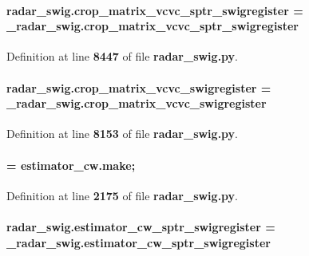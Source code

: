 \paragraph[{crop\+\_\+matrix\+\_\+vcvc\+\_\+sptr\+\_\+swigregister}]{\setlength{\rightskip}{0pt plus 5cm}radar\+\_\+swig.\+crop\+\_\+matrix\+\_\+vcvc\+\_\+sptr\+\_\+swigregister = \+\_\+radar\+\_\+swig.\+crop\+\_\+matrix\+\_\+vcvc\+\_\+sptr\+\_\+swigregister}\label{namespaceradar__swig_a4e4048aa40c96348c493ddb524caaaf1}


Definition at line {\bf 8447} of file {\bf radar\+\_\+swig.\+py}.

\paragraph[{crop\+\_\+matrix\+\_\+vcvc\+\_\+swigregister}]{\setlength{\rightskip}{0pt plus 5cm}radar\+\_\+swig.\+crop\+\_\+matrix\+\_\+vcvc\+\_\+swigregister = \+\_\+radar\+\_\+swig.\+crop\+\_\+matrix\+\_\+vcvc\+\_\+swigregister}\label{namespaceradar__swig_a08d4f7c43baabbd3239fecea121b4842}


Definition at line {\bf 8153} of file {\bf radar\+\_\+swig.\+py}.

\paragraph[{estimator\+\_\+cw}]{ = {\bf estimator\+\_\+cw.\+make};}\label{namespaceradar__swig_a9c5dab2954f1e8b1664a6040c583d9ef}


Definition at line {\bf 2175} of file {\bf radar\+\_\+swig.\+py}.

\paragraph[{estimator\+\_\+cw\+\_\+sptr\+\_\+swigregister}]{\setlength{\rightskip}{0pt plus 5cm}radar\+\_\+swig.\+estimator\+\_\+cw\+\_\+sptr\+\_\+swigregister = \+\_\+radar\+\_\+swig.\+estimator\+\_\+cw\+\_\+sptr\+\_\+swigregister}\label{namespaceradar__swig_a0fff57c46e559630ab2e45c8f4aa053c}


